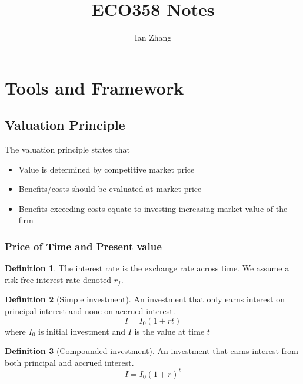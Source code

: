 \documentclass[11pt]{article}
\title{ECO358 Notes}
\author{Ian Zhang}
\theoremstyle{definition}
\newtheorem*{definition}{Definition}
\begin{document}
\maketitle

\tableofcontents

\newpage

\section{Tools and Framework}
\subsection{Valuation Principle}
The valuation principle states that 
\begin{itemize}
    \item Value is determined by competitive market price
    \item Benefits/costs should be evaluated at market price
    \item Benefits exceeding costs equate to investing increasing market value of the firm
\end{itemize}

\subsubsection{Price of Time and Present value}

\begin{definition}
    The interest rate is the exchange rate across time. We assume a risk-free interest rate denoted $r_f$. 
\end{definition}

\begin{definition}[Simple investment]
    An investment that only earns interest on principal interest and none on accrued interest.
    \begin{equation*}
        I = I_0(1 + rt)
    \end{equation*}
    where $I_0$ is initial investment and $I$ is the value at time $t$
\end{definition}

\begin{definition}[Compounded investment]
    An investment that earns interest from both principal and accrued interest.
    \begin{equation*}
        I = I_0(1 + r)^t
    \end{equation*}
\end{definition}
\end{document}
